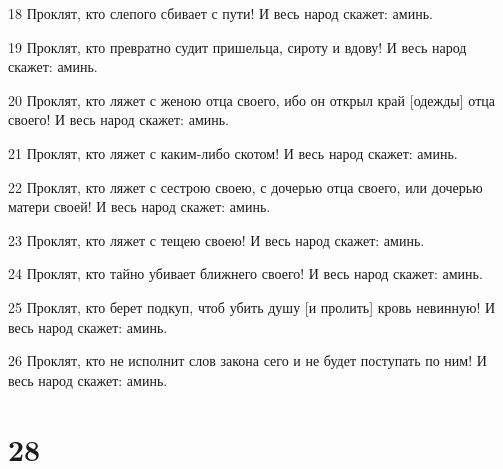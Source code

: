\par 18 Проклят, кто слепого сбивает с пути! И весь народ скажет: аминь.
\par 19 Проклят, кто превратно судит пришельца, сироту и вдову! И весь народ скажет: аминь.
\par 20 Проклят, кто ляжет с женою отца своего, ибо он открыл край [одежды] отца своего! И весь народ скажет: аминь.
\par 21 Проклят, кто ляжет с каким-либо скотом! И весь народ скажет: аминь.
\par 22 Проклят, кто ляжет с сестрою своею, с дочерью отца своего, или дочерью матери своей! И весь народ скажет: аминь.
\par 23 Проклят, кто ляжет с тещею своею! И весь народ скажет: аминь.
\par 24 Проклят, кто тайно убивает ближнего своего! И весь народ скажет: аминь.
\par 25 Проклят, кто берет подкуп, чтоб убить душу [и пролить] кровь невинную! И весь народ скажет: аминь.
\par 26 Проклят, кто не исполнит слов закона сего и не будет поступать по ним! И весь народ скажет: аминь.

\chapter{28}

